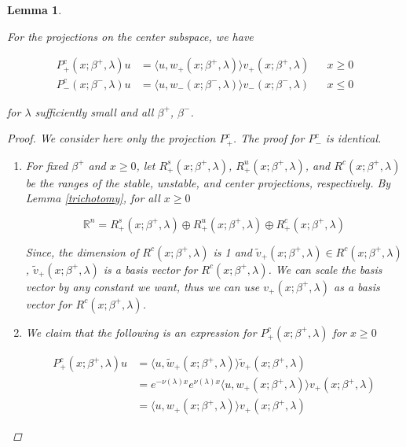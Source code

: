 \documentclass[12pt]{article}
\def\R{{\mathbb R}}
\newtheorem{lemma}{Lemma}
\begin{document}
\begin{lemma}\label{centerproj}

For the projections on the center subspace, we have

\begin{align}\label{Pc}
P^c_+(x; \beta^+, \lambda)u &= \langle u, w_+(x; \beta^+, \lambda) \rangle v_+(x; \beta^+, \lambda) && x \geq 0 \\
P^c_-(x; \beta^-, \lambda)u &= \langle u, w_-(x; \beta^-, \lambda) \rangle v_-(x; \beta^-, \lambda) && x \leq 0
\end{align}

for $\lambda$ sufficiently small and all $\beta^+$, $\beta^-$.

\begin{proof}

We consider here only the projection $P^c_+$. The proof for $P^c_-$ is identical.

\begin{enumerate}

\item For fixed $\beta^+$ and $x \geq 0$, let $R^s_+(x; \beta^+, \lambda)$, $R^u_+(x; \beta^+, \lambda)$, and $R^c(x; \beta^+, \lambda)$ be the ranges of the stable, unstable, and center projections, respectively. By Lemma \ref{trichotomy}, for all $x \geq 0$

\[
\R^n = R^s_+(x; \beta^+, \lambda) \oplus R^u_+(x; \beta^+, \lambda) \oplus R^c_+(x; \beta^+, \lambda)
\]

Since, the dimension of $R^c(x; \beta^+, \lambda)$ is 1 and $\tilde{v}_+(x; \beta^+, \lambda) \in R^c(x; \beta^+, \lambda)$, $\tilde{v}_+(x; \beta^+, \lambda)$ is a basis vector for $R^c(x; \beta^+, \lambda)$. We can scale the basis vector by any constant we want, thus we can use $v_+(x; \beta^+, \lambda)$ as a basis vector for $R^c(x; \beta^+, \lambda)$.

\item We claim that the following is an expression for $P^c_+(x; \beta^+, \lambda)$ for $x \geq 0$

\begin{align*}
P^c_+(x; \beta^+, \lambda)u &= \langle u, \tilde{w}_+(x; \beta^+, \lambda) \rangle \tilde{v}_+(x; \beta^+, \lambda) \\
&= e^{-\nu(\lambda)x} e^{\nu(\lambda) x }\langle u, w_+(x; \beta^+, \lambda) \rangle v_+(x; \beta^+, \lambda) \\
&= \langle u, w_+(x; \beta^+, \lambda) \rangle v_+(x; \beta^+, \lambda)
\end{align*}


\end{enumerate}
\end{proof}
\end{lemma}
\end{document}
